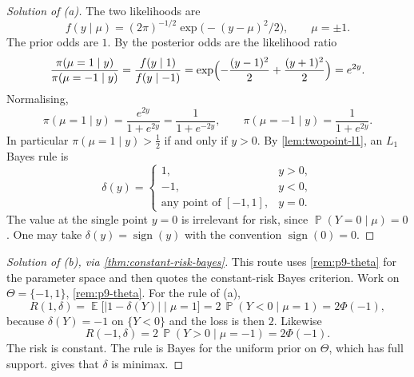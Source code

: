 \documentclass[11pt,a4paper]{article}
\DeclareMathOperator{\E}{\mathbb{E}}
\DeclareMathOperator{\Pbb}{\mathbb{P}}
\begin{document}
\begin{proof}[Solution of (a)]
The two likelihoods are
\[
f(y\mid\mu)
=
(2\pi)^{-1/2}\exp\bigl(-(y-\mu)^2/2\bigr),
\qquad
\mu=\pm 1.
\]
The prior odds are \(1\). By \citep[(1.5)]{gelman2013} the posterior odds are the likelihood ratio
\[
\frac{\pi(\mu=1\mid y)}{\pi(\mu=-1\mid y)}
=
\frac{f(y\mid 1)}{f(y\mid -1)}
=
\exp\Bigl(-\frac{(y-1)^2}{2}+\frac{(y+1)^2}{2}\Bigr)
=
e^{2y}.
\]
Normalising,
\[
\pi(\mu=1\mid y)
=
\frac{e^{2y}}{1+e^{2y}}
=
\frac{1}{1+e^{-2y}},
\qquad
\pi(\mu=-1\mid y)
=
\frac{1}{1+e^{2y}}.
\]
In particular \(\pi(\mu=1\mid y)>\tfrac12\) if and only if \(y>0\). By \cref{lem:twopoint-l1}, an \(L_1\) Bayes rule is
\[
\delta(y)
=
\begin{cases}
1, & y>0,\\
-1, & y<0,\\
\text{any point of }[-1,1], & y=0.
\end{cases}
\]
The value at the single point \(y=0\) is irrelevant for risk, since \(\Pbb(Y=0\mid\mu)=0\). One may take \(\delta(y)=\operatorname{sign}(y)\) with the convention \(\operatorname{sign}(0)=0\).
\end{proof}

\begin{proof}[Solution of (b), via \cref{thm:constant-risk-bayes}]
This route uses \cref{rem:p9-theta} for the parameter space and then quotes the constant-risk Bayes criterion. Work on \(\Theta=\{-1,1\}\), \cref{rem:p9-theta}. For the rule of (a),
\[
R(1,\delta)
=
\E\bigl[|1-\delta(Y)|\mid\mu=1\bigr]
=
2\,\Pbb(Y<0\mid\mu=1)
=
2\Phi(-1),
\]
because \(\delta(Y)=-1\) on \(\{Y<0\}\) and the loss is then \(2\). Likewise
\[
R(-1,\delta)
=
2\,\Pbb(Y>0\mid\mu=-1)
=
2\Phi(-1).
\]
The risk is constant. The rule is Bayes for the uniform prior on \(\Theta\), which has full support.  gives that \(\delta\) is minimax.
\end{proof}
\end{document}
